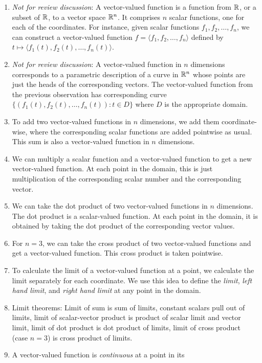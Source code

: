 \documentclass[10pt]{amsart}
\begin{document}
\begin{enumerate}
\item {\em Not for review discussion}: A vector-valued function is a
  function from $\mathbb{R}$, or a subset of $\mathbb{R}$, to a vector space
  $\mathbb{R}^n$. It comprises $n$ scalar functions, one for each of the
  coordinates. For instance, given scalar functions $f_1, f_2, \dots,
  f_n$, we can construct a vector-valued function $f = \langle f_1,
  f_2, \dots, f_n \rangle$ defined by $t \mapsto \langle f_1(t),
  f_2(t), \dots, f_n(t) \rangle$.
\item {\em Not for review discussion}: A vector-valued function in $n$
  dimensions corresponds to a parametric description of a curve in
  $\mathbb{R}^n$ whose points are just the heads of the corresponding
  vectors. The vector-valued function from the previous observation
  has corresponding curve $\{ (f_1(t),f_2(t),\dots,f_n(t)): t \in D \}$
  where $D$ is the appropriate domain.
\item To add two vector-valued functions in $n$ dimensions, we add
  them coordinate-wise, where the corresponding scalar functions are
  added pointwise as usual. This sum is also a vector-valued function
  in $n$ dimensions.
\item We can multiply a scalar function and a vector-valued function
  to get a new vector-valued function. At each point in the domain,
  this is just multiplication of the corresponding scalar number and
  the corresponding vector.
\item We can take the dot product of two vector-valued functions in
  $n$ dimensions. The dot product is a scalar-valued function. At each
  point in the domain, it is obtained by taking the dot product of the
  corresponding vector values.
\item For $n = 3$, we can take the cross product of two vector-valued
  functions and get a vector-valued function. This cross product is
  taken pointwise.
\item To calculate the limit of a vector-valued function at a point,
  we calculate the limit separately for each coordinate. We use this
  idea to define the {\em limit}, {\em left hand limit}, and {\em
  right hand limit} at any point in the domain.
\item Limit theorems: Limit of sum is sum of limits, constant scalars
  pull out of limits, limit of scalar-vector product is product of
  scalar limit and vector limit, limit of dot product is dot product
  of limits, limit of cross product (case $n = 3$) is cross product of limits.
\item A vector-valued function is {\em continuous} at a point in its

\end{enumerate}
\end{document}
